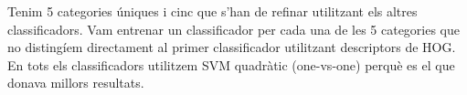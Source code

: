 Tenim 5 categories úniques i cinc que s'han de refinar utilitzant els altres
classificadors. Vam entrenar un classificador per cada una de les 5 categories
que no distingíem directament al primer classificador utilitzant descriptors de
HOG. En tots els classificadors utilitzem SVM quadràtic (one-vs-one) perquè es
el que donava millors resultats.

